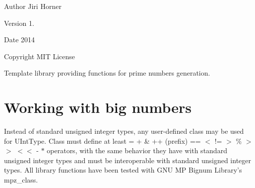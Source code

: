 \begin{DoxyAuthor}{Author}
Jiri Horner
\end{DoxyAuthor}
\begin{DoxyVersion}{Version}
1. 
\end{DoxyVersion}
\begin{DoxyDate}{Date}
2014 
\end{DoxyDate}
\begin{DoxyCopyright}{Copyright}
M\-I\-T License
\end{DoxyCopyright}
Template library providing functions for prime numbers generation.\hypertarget{index_bignums}{}\section{Working with big numbers}\label{index_bignums}
Instead of standard unsigned integer types, any user-\/defined class may be used for {\ttfamily U\-Int\-Type}. Class must define at least {\ttfamily = + \& ++ (prefix) == $<$ != $>$ \% $>$$>$ $<$$<$ -\/ $\ast$} operators, with the same behavior they have with standard unsigned integer types and must be interoperable with standard unsigned integer types. All library functions have been tested with G\-N\-U M\-P Bignum Library's {\ttfamily mpz\-\_\-class}. 
